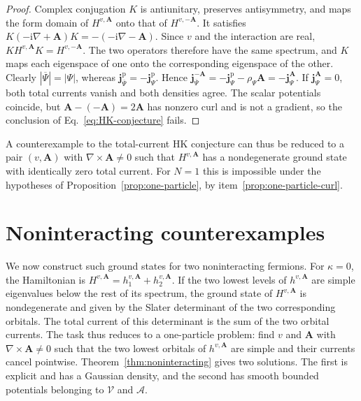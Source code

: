 \documentclass[11pt,a4paper]{article}
\theoremstyle{remark}
\theoremstyle{plain}
\newcommand{\jp}{\mathbf j^{\mathrm p}}
\newcommand{\jj}{\mathbf j}
\newcommand{\A}{\mathbf A}
\begin{document}
\begin{proof}
Complex conjugation $K$ is antiunitary, preserves antisymmetry, and
maps the form domain of $H^{v,\A}$ onto that of $H^{v,-\A}$.
It satisfies $K(-\mathrm{i}\nabla+\A)K=-(-\mathrm{i}\nabla-\A)$.
Since $v$ and the interaction are real, $KH^{v,\A}K=H^{v,-\A}$. The
two operators therefore have the same spectrum, and $K$ maps each
eigenspace of one onto the corresponding eigenspace of the other.
Clearly $|\overline\Psi|=|\Psi|$, whereas $\jp_{\overline\Psi}
=-\jp_\Psi$. Hence
$\jj_{\overline\Psi}^{-\A}=-\jp_\Psi-\rho_\Psi\A=-\jj_{\Psi}^{\A}$.
If $\jj_{\Psi}^{\A}=0$, both total currents vanish and both densities
agree. The scalar potentials coincide, but $\A-(-\A)=2\A$ has
nonzero curl and is not a gradient, so the conclusion of
Eq.~\eqref{eq:HK-conjecture} fails.
\end{proof}

A counterexample to the total-current HK conjecture can thus be reduced to a
pair $(v,\A)$ with $\nabla\times\A\ne0$ such that $H^{v,\A}$ has a
nondegenerate ground state with identically zero total current. For
$N=1$ this is impossible under the hypotheses of
Proposition~\ref{prop:one-particle}, by
item~\ref{prop:one-particle-curl}.

\section{Noninteracting counterexamples}
\label{sec:noninteracting}

We now construct such ground states for two noninteracting fermions.
For $\kappa=0$, the Hamiltonian is
$H^{v,\A}=h_1^{v,\A}+h_2^{v,\A}$. If the two lowest levels of
$h^{v,\A}$ are simple eigenvalues below the rest of its spectrum, the
ground state of $H^{v,\A}$ is nondegenerate and given by the Slater
determinant of the two corresponding orbitals. The total current of
this determinant is the sum of the two orbital currents. The task thus reduces to a
one-particle problem: find $v$ and $\A$ with $\nabla\times\A\ne0$ such
that the two lowest orbitals of $h^{v,\A}$ are simple and their
currents cancel pointwise. Theorem~\ref{thm:noninteracting} gives two
solutions. The first is explicit and has a Gaussian density, and the
second has smooth bounded potentials belonging to
$\mathcal V$ and $\mathcal A$.
\end{document}

